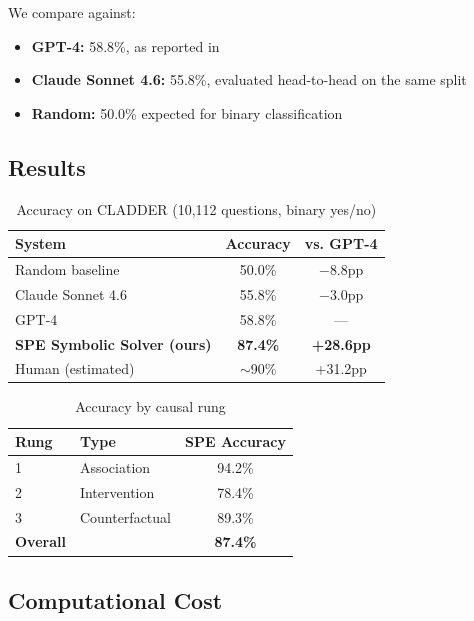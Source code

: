 \documentclass[11pt]{article}
\begin{document}
We compare against:
\begin{itemize}
    \item \textbf{GPT-4:} 58.8\%, as reported in \cite{jin2023cladder}
    \item \textbf{Claude Sonnet 4.6:} 55.8\%, evaluated head-to-head
    on the same split
    \item \textbf{Random:} 50.0\% expected for binary classification
\end{itemize}

\subsection{Results}

\begin{table}[h]
\centering
\caption{Accuracy on CLADDER (10,112 questions, binary yes/no)}
\begin{tabular}{lcc}
\toprule
\textbf{System} & \textbf{Accuracy} & \textbf{vs. GPT-4} \\
\midrule
Random baseline & 50.0\% & $-8.8$pp \\
Claude Sonnet 4.6 & 55.8\% & $-3.0$pp \\
GPT-4 \cite{jin2023cladder} & 58.8\% & --- \\
\textbf{SPE Symbolic Solver (ours)} & \textbf{87.4\%} & \textbf{+28.6pp} \\
\midrule
Human (estimated) & $\sim$90\% & +31.2pp \\
\bottomrule
\end{tabular}
\end{table}

\begin{table}[h]
\centering
\caption{Accuracy by causal rung}
\begin{tabular}{llc}
\toprule
\textbf{Rung} & \textbf{Type} & \textbf{SPE Accuracy} \\
\midrule
1 & Association & 94.2\% \\
2 & Intervention & 78.4\% \\
3 & Counterfactual & 89.3\% \\
\midrule
\textbf{Overall} & & \textbf{87.4\%} \\
\bottomrule
\end{tabular}
\end{table}

\subsection{Computational Cost}
\end{document}
